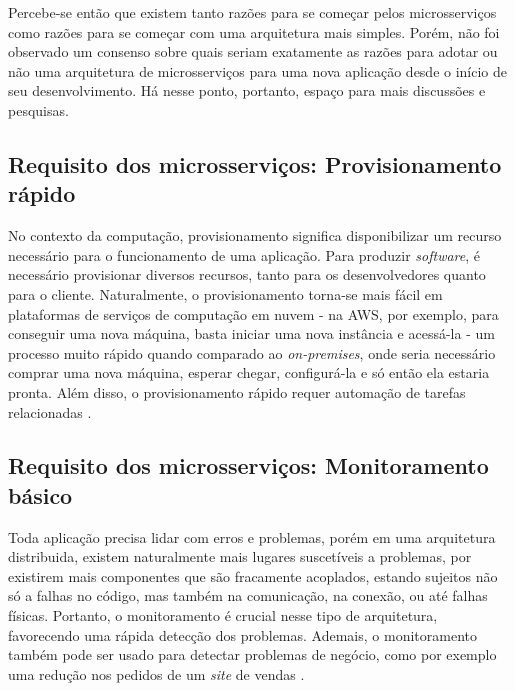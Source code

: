 Percebe-se então que existem tanto razões para se começar pelos microsserviços como razões para se começar com uma arquitetura mais simples. Porém, não foi observado um consenso sobre quais seriam exatamente as razões para adotar ou não uma arquitetura de microsserviços para uma nova aplicação desde o início de seu desenvolvimento. Há nesse ponto, portanto, espaço para mais discussões e pesquisas.


\subsection{Requisito dos microsserviços: Provisionamento rápido}\label{boas-praticas-provisionamento-rapido}

No contexto da computação, provisionamento significa disponibilizar um recurso necessário para o funcionamento de uma aplicação. Para produzir \emph{software}, é necessário provisionar diversos recursos, tanto para os desenvolvedores quanto para o cliente. Naturalmente, o provisionamento torna-se mais fácil em plataformas de serviços de computação em nuvem - na AWS, por exemplo, para conseguir uma nova máquina, basta iniciar uma nova instância e acessá-la - um processo muito rápido quando comparado ao \emph{on-premises}, onde seria necessário comprar uma nova máquina, esperar chegar, configurá-la e só então ela estaria pronta. Além disso, o provisionamento rápido requer automação de tarefas relacionadas \cite{martin-fowler-microservice-prereq}.

\subsection{Requisito dos microsserviços: Monitoramento básico}\label{boas-praticas-monitoramento-basico}

Toda aplicação precisa lidar com erros e problemas, porém em uma arquitetura distribuida, existem naturalmente mais lugares suscetíveis a problemas, por existirem mais componentes que são fracamente acoplados, estando sujeitos não só a falhas no código, mas também na comunicação, na conexão, ou até falhas físicas. Portanto, o monitoramento é crucial nesse tipo de arquitetura, favorecendo uma rápida detecção dos problemas. Ademais, o monitoramento também pode ser usado para detectar problemas de negócio, como por exemplo uma redução nos pedidos de um \emph{site} de vendas \cite{martin-fowler-microservice-prereq}.

